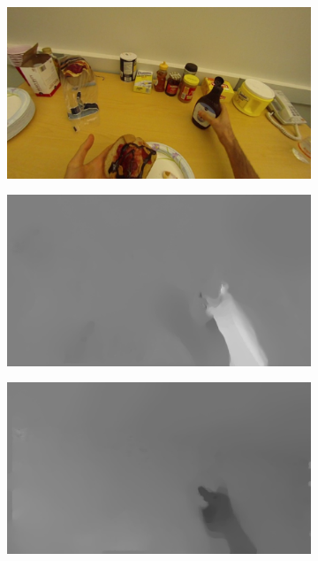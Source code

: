 \documentclass[10pt,twocolumn,hidelinks,letterpaper]{article}
\begin{document}
\begin{figure}
  \centering
  \begin{subfigure}{.24\linewidth}
  	\includegraphics[width=\linewidth]{images/img_comp/rgb0001.png}
  \end{subfigure}
  \begin{subfigure}{.24\linewidth}
  	\includegraphics[width=\linewidth]{images/img_comp/flow_x_00002.png}
  \end{subfigure}
  \begin{subfigure}{.24\linewidth}
  	\includegraphics[width=\linewidth]{images/img_comp/flow_y_00001.png}

\end{subfigure}
\end{figure}
\end{document}
